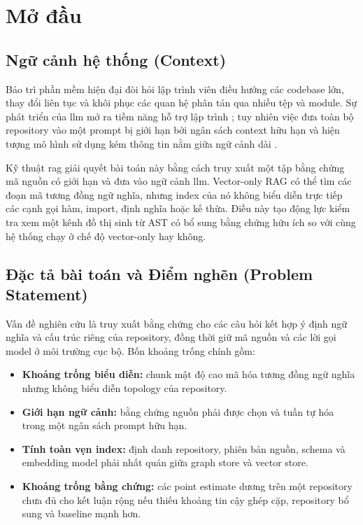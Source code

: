 \documentclass[12pt,a4paper,oneside]{report}
\begin{document}
\newpage

\chapter{Mở đầu}

\section{Ngữ cảnh hệ thống (Context)}
Bảo trì phần mềm hiện đại đòi hỏi lập trình viên điều hướng các codebase lớn, thay đổi liên tục và khôi phục các quan hệ phân tán qua nhiều tệp và module. Sự phát triển của \gls{llm} mở ra tiềm năng hỗ trợ lập trình \cite{chen2021codex}; tuy nhiên việc đưa toàn bộ repository vào một prompt bị giới hạn bởi ngân sách context hữu hạn và hiện tượng mô hình sử dụng kém thông tin nằm giữa ngữ cảnh dài \cite{liu2023lost}.

Kỹ thuật \gls{rag} \cite{lewis2020rag} giải quyết bài toán này bằng cách truy xuất một tập bằng chứng mã nguồn có giới hạn và đưa vào ngữ cảnh \gls{llm}. Vector-only RAG có thể tìm các đoạn mã tương đồng ngữ nghĩa, nhưng index của nó không biểu diễn trực tiếp các cạnh gọi hàm, import, định nghĩa hoặc kế thừa. Điều này tạo động lực kiểm tra xem một kênh đồ thị sinh từ AST có bổ sung bằng chứng hữu ích so với cùng hệ thống chạy ở chế độ vector-only hay không.

\section{Đặc tả bài toán và Điểm nghẽn (Problem Statement)}
Vấn đề nghiên cứu là truy xuất bằng chứng cho các câu hỏi kết hợp ý định ngữ nghĩa và cấu trúc riêng của repository, đồng thời giữ mã nguồn và các lời gọi model ở môi trường cục bộ. Bốn khoảng trống chính gồm:

\begin{itemize}
    \item \textbf{Khoảng trống biểu diễn:} chunk mật độ cao mã hóa tương đồng ngữ nghĩa nhưng không biểu diễn topology của repository.
    \item \textbf{Giới hạn ngữ cảnh:} bằng chứng nguồn phải được chọn và tuần tự hóa trong một ngân sách prompt hữu hạn.
    \item \textbf{Tính toàn vẹn index:} định danh repository, phiên bản nguồn, schema và embedding model phải nhất quán giữa graph store và vector store.
    \item \textbf{Khoảng trống bằng chứng:} các point estimate dương trên một repository chưa đủ cho kết luận rộng nếu thiếu khoảng tin cậy ghép cặp, repository bổ sung và baseline mạnh hơn.
\end{itemize}
\end{document}
